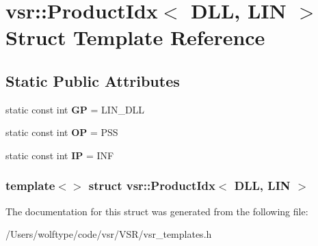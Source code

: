 \hypertarget{structvsr_1_1_product_idx_3_01_d_l_l_00_01_l_i_n_01_4}{\section{vsr\-:\-:Product\-Idx$<$ D\-L\-L, L\-I\-N $>$ Struct Template Reference}
\label{structvsr_1_1_product_idx_3_01_d_l_l_00_01_l_i_n_01_4}
}
\subsection*{Static Public Attributes}
\begin{DoxyCompactItemize}
\item 
\hypertarget{structvsr_1_1_product_idx_3_01_d_l_l_00_01_l_i_n_01_4_a898c323a8ea903d34f64262eb59c1bd9}{static const int {\bfseries G\-P} = L\-I\-N\-\_\-\-D\-L\-L}\label{structvsr_1_1_product_idx_3_01_d_l_l_00_01_l_i_n_01_4_a898c323a8ea903d34f64262eb59c1bd9}

\item 
\hypertarget{structvsr_1_1_product_idx_3_01_d_l_l_00_01_l_i_n_01_4_a8d5020bdbce8effb36ca3a061223e2af}{static const int {\bfseries O\-P} = P\-S\-S}\label{structvsr_1_1_product_idx_3_01_d_l_l_00_01_l_i_n_01_4_a8d5020bdbce8effb36ca3a061223e2af}

\item 
\hypertarget{structvsr_1_1_product_idx_3_01_d_l_l_00_01_l_i_n_01_4_ac39e7175b88de30b8499694277ba33d7}{static const int {\bfseries I\-P} = I\-N\-F}\label{structvsr_1_1_product_idx_3_01_d_l_l_00_01_l_i_n_01_4_ac39e7175b88de30b8499694277ba33d7}

\end{DoxyCompactItemize}
\subsubsection*{template$<$$>$ struct vsr\-::\-Product\-Idx$<$ D\-L\-L, L\-I\-N $>$}



The documentation for this struct was generated from the following file\-:\begin{DoxyCompactItemize}
\item 
/\-Users/wolftype/code/vsr/\-V\-S\-R/vsr\-\_\-templates.\-h\end{DoxyCompactItemize}
